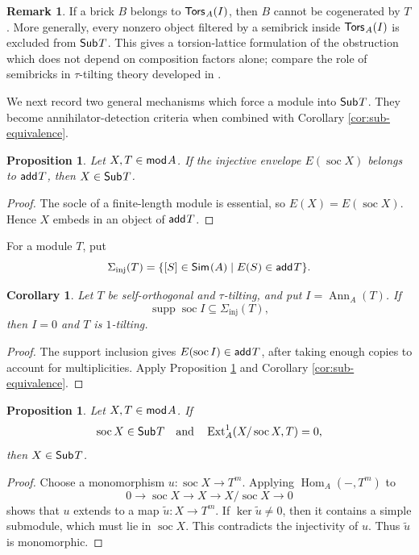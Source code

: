 \documentclass[a4paper,reqno]{amsart}
\newtheorem{corollary}[theorem]{Corollary}
\newtheorem{proposition}[theorem]{Proposition}
\theoremstyle{definition}
\newtheorem{remark}[theorem]{Remark}
\newcommand{\Ext}{\operatorname{Ext}\nolimits}
\newcommand{\Hom}{\operatorname{Hom}\nolimits}
\newcommand{\Ann}{\operatorname{Ann}\nolimits}
\newcommand{\soc}{\operatorname{soc}\nolimits}
\newcommand{\supp}{\operatorname{supp}\nolimits}
\newcommand{\add}{\mathsf{add}\hspace{.01in}}
\newcommand{\Sub}{\mathsf{Sub}\hspace{.01in}}
\newcommand{\Tors}{\mathsf{Tors}\hspace{.01in}}
\newcommand{\Sim}{\mathsf{Sim}\hspace{.01in}}
\newcommand{\modA}{\mathsf{mod}\hspace{.01in}A}
\numberwithin{equation}{section}
\begin{document}
\begin{remark}\label{rem:semibrick}
If a brick $B$ belongs to $\Tors_A(I)$, then $B$ cannot be cogenerated
by $T$. More generally, every nonzero object filtered by a semibrick
inside $\Tors_A(I)$ is excluded from $\Sub T$. This gives a
torsion-lattice formulation of the obstruction which does not depend
on composition factors alone; compare the role of semibricks in
$\tau$-tilting theory developed in \cite{Asai}.
\end{remark}

We next record two general mechanisms which force a module into
$\Sub T$. They become annihilator-detection criteria when combined
with Corollary \ref{cor:sub-equivalence}.

\begin{proposition}
\label{prop:injective-envelope}
Let $X,T\in\modA$. If the injective envelope $E(\soc X)$ belongs to
$\add T$, then $X\in\Sub T$.
\end{proposition}

\begin{proof}
The socle of a finite-length module is essential, so
$E(X)=E(\soc X)$. Hence $X$ embeds in an object of $\add T$.
\end{proof}

For a module $T$, put
\[
 \Sigma_{\mathrm{inj}}(T)=
 \{[S]\in\Sim(A)\mid E(S)\in\add T\}.
\]

\begin{corollary}\label{cor:injective-support}
Let $T$ be self-orthogonal and $\tau$-tilting, and put
$I=\Ann_A(T)$.  If
\[
                \supp\soc I\subseteq\Sigma_{\mathrm{inj}}(T),
\]
then $I=0$ and $T$ is $1$-tilting.
\end{corollary}

\begin{proof}
The support inclusion gives $E(\soc I)\in\add T$, after taking enough
copies to account for multiplicities. Apply Proposition
\ref{prop:injective-envelope} and Corollary
\ref{cor:sub-equivalence}.
\end{proof}

\begin{proposition}\label{prop:socle-lifting}
Let $X,T\in\modA$.  If
\[
        \soc X\in\Sub T
        \quad\text{and}\quad
        \Ext_A^1(X/\soc X,T)=0,
\]
then $X\in\Sub T$.
\end{proposition}

\begin{proof}
Choose a monomorphism $u:\soc X\to T^m$. Applying
$\Hom_A(-,T^m)$ to
\[
 0\longrightarrow\soc X\longrightarrow X\longrightarrow
 X/\soc X\longrightarrow0
\]
shows that $u$ extends to a map $\widetilde u:X\to T^m$. If
$\ker\widetilde u\neq0$, then it contains a simple submodule, which
must lie in $\soc X$. This contradicts the injectivity of $u$. Thus $\widetilde u$ is monomorphic.
\end{proof}
\end{document}

